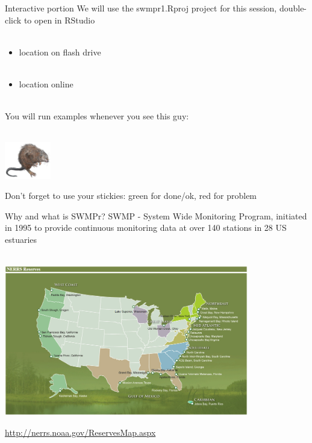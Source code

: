 \documentclass[xcolor=dvipsnames,serif]{beamer}\usepackage[]{graphicx}\usepackage[]{color}
\begin{document}
\begin{frame}{Interactive portion}
\onslide<+->
We will use the swmpr1.Rproj project for this session, double-click to open in RStudio \\~\\
\begin{itemize}
\item location on flash drive\\~\\
\item location online \\~\\
\end{itemize}
\onslide<+->
You will run examples whenever you see this guy: \\~\\
\centerline{\includegraphics[width = 0.15\textwidth]{imgs/swmprat.png}} 
Don't forget to use your stickies: {\color{green} green} for done/ok, {\color{red} red} for problem
\end{frame}

\begin{frame}{Why and what is SWMPr?}
SWMP - System Wide Monitoring Program, initiated in 1995 to provide continuous monitoring data at over 140 stations in 28 US estuaries \\~\\
\centerline{\includegraphics[width = 0.8\textwidth]{imgs/NERRS_locations.png}}
\tiny
\flushright
\href{http://nerrs.noaa.gov/ReservesMap.aspx}{http://nerrs.noaa.gov/ReservesMap.aspx}
\end{frame}
\end{document}
